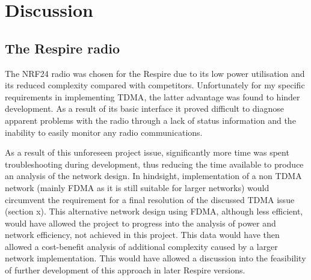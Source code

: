 \chapter{Discussion}

\section{The Respire radio}
The \ac{NRF24} radio was chosen for the Respire due to its low power utilisation
and its reduced complexity compared with competitors. Unfortunately for my specific
requirements in implementing \ac{TDMA}, the latter advantage was found to hinder
development. As a result of its basic interface it proved difficult to diagnose
apparent problems with the radio through a lack of status information and the
inability to easily monitor any radio communications.


As a result of this unforeseen project issue, significantly more time was spent
troubleshooting during development, thus reducing the time available to produce
an analysis of the network design. In hindsight, implementation of a non \ac{TDMA}
network (mainly \ac{FDMA} as it is still suitable for larger networks) would
circumvent the requirement for a final resolution of the discussed \ac{TDMA}
issue (section x). This alternative network design using \ac{FDMA}, although less
efficient, would have allowed the project to progress into the analysis of power
and network efficiency, not achieved in this project. This data would have then
allowed a cost-benefit analysis of additional complexity caused by a larger network
implementation. This would have allowed a discussion into the feasibility of
further development of this approach in later Respire versions.


